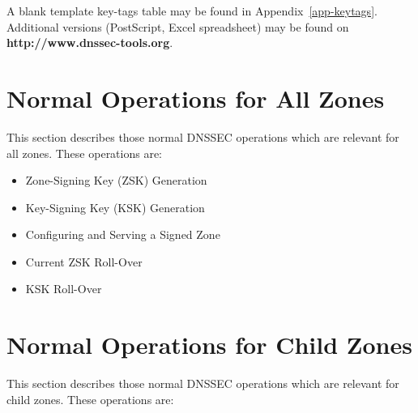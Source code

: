 \documentclass[12pt]{article}
\newcommand{\url}[1]{{\bf #1}}
\begin{document}
A blank template key-tags table may be found in Appendix~\ref{app-keytags}.
Additional versions (PostScript, Excel spreadsheet) may be found on
\url{http://www.dnssec-tools.org}.


\clearpage

\section{Normal Operations for All Zones}
\label{normal-all}

This section describes those normal DNSSEC operations which are relevant for
all zones.  These operations are:

\begin{itemize}
\item Zone-Signing Key (ZSK) Generation
\item Key-Signing Key (KSK) Generation
\item Configuring and Serving a Signed Zone
\item Current ZSK Roll-Over
\item KSK Roll-Over
\end{itemize}








\clearpage

\section{Normal Operations for Child Zones}
\label{normal-child}

This section describes those normal DNSSEC operations which are relevant
for child zones.  These operations are:
\end{document}
